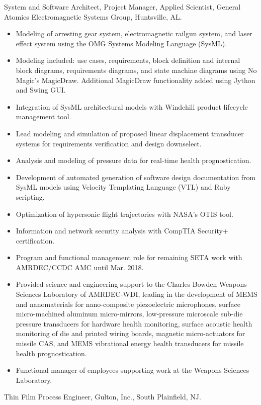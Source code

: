 \documentclass[american]{cv}
\begin{document}
\begin{topic}
\item [March 2010 - August 2019]System and Software Architect, Project Manager,
Applied Scientist, General Atomics Electromagnetic Systems Group, Huntsville, AL.

\begin{itemize}
\item Modeling of arresting gear system, electromagnetic railgun system, and
laser effect system using the OMG Systems Modeling Language (SysML).
\item Modeling included: use cases, requirements, block definition and internal
block diagrams, requirements diagrams, and state machine diagrams using No
Magic's MagicDraw. Additional MagicDraw functionality added using Jython and
Swing GUI.
\item Integration of SysML architectural models with Windchill product
lifecycle management tool.
\item Lead modeling and simulation of proposed linear displacement transducer
systems for requirements verification and design downselect.
\item Analysis and modeling of pressure data for real-time health prognostication.
\item Development of automated generation of software design documentation from
SysML models using Velocity Templating Language (VTL) and Ruby scripting.
\item Optimization of hypersonic flight trajectories with NASA's OTIS tool.
\item Information and network security analysis with CompTIA Security+
certification.
\item Program and functional management role for remaining SETA work with
AMRDEC/CCDC AMC until Mar. 2018.
\item Provided science and engineering support to the Charles Bowden Weapons
Sciences Laboratory of AMRDEC-WDI, leading in the development of MEMS and
nanomaterials for nano-composite piezoelectric microphones, surface
micro-machined aluminum micro-mirrors, low-pressure microscale sub-die
pressure transducers for hardware health monitoring, surface acoustic health
monitoring of die and printed wiring boards, magnetic micro-actuators for
missile CAS, and MEMS vibrational energy health transducers for missile
health prognostication.
\item Functional manager of employees supporting work at the Weapons Sciences
Laboratory.
\end{itemize}

\item [July 2007 - March 2010]Thin Film Process Engineer, Gulton, Inc.,
South Plainfield, NJ.


\end{topic}
\end{document}

